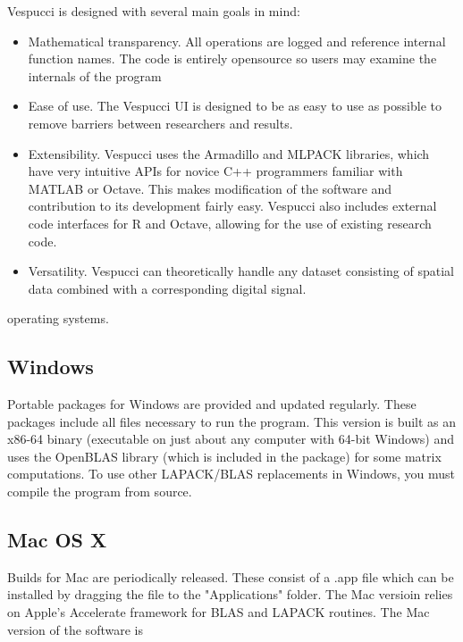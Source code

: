 \documentclass[12pt]{achemso} %
\begin{document}
Vespucci is designed with several main goals in mind: \begin{itemize} \item
Mathematical transparency. All operations are logged and reference internal
function names. The code is entirely opensource so users may examine the
internals of the program \item Ease of use. The Vespucci UI is designed to be as
easy to use as possible to remove barriers between researchers and results.
\item Extensibility. Vespucci uses the Armadillo and MLPACK libraries, which
have very intuitive APIs for novice C++ programmers familiar with MATLAB or
Octave. This makes modification of the software and contribution to its
development fairly easy. Vespucci also includes external code interfaces for R
and Octave, allowing for the use of existing research code. \item Versatility.
Vespucci can theoretically handle any dataset consisting of spatial data
combined with a corresponding digital signal. \end{itemize}


operating systems.

\subsection{Windows} Portable packages for Windows are provided and updated
regularly. These packages include all files necessary to run the program. This
version is built as an x86-64 binary (executable on just about any computer with
64-bit Windows) and uses the OpenBLAS library (which is included in the package)
for some matrix computations. To use other LAPACK/BLAS replacements in Windows,
you must compile the program from source.

\subsection{Mac OS X} Builds for Mac are periodically released. These consist of
a .app file which can be installed by dragging the file to the "Applications"
folder. The Mac versioin relies on Apple's Accelerate framework for BLAS and
LAPACK routines. The Mac version of the software is
\end{document}

